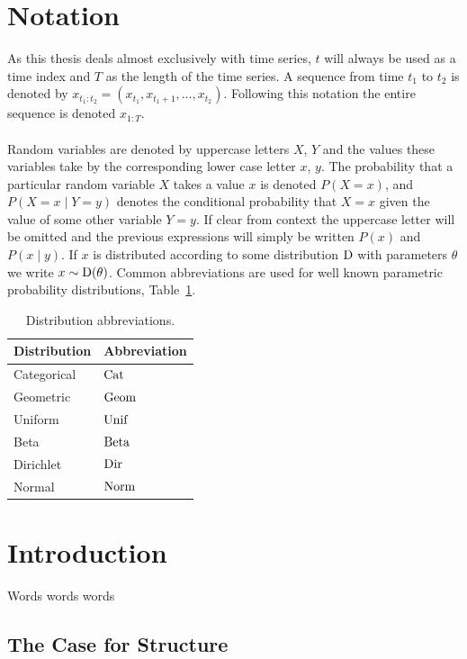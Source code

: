 \documentclass[12pt]{report}
\newcommand{\1}[0]{\mathbbm{1}}
\newcommand{\Beta}[0]{\textnormal{Beta}}
\newcommand{\Unif}[0]{\textnormal{Unif}}
\newcommand{\Cat}[0]{\textnormal{Cat}}
\newcommand{\Dir}[0]{\textnormal{Dir}}
\newcommand{\Norm}[0]{\textnormal{Norm}}
\newcommand{\SomeDist}[0]{\textnormal{D}}
\newcommand{\Geom}[0]{\textnormal{Geom}}
\newcommand{\seq}[3]{\ensuremath{#1_{{#2}:{#3}}}}
\begin{document}
\cleardoublepage
{}
\chapter*{Notation}
As this thesis deals almost exclusively with time series, $t$ will always
be used as a time index and $T$ as the length of the time series.
A sequence from time $t_1$ to $t_2$ is denoted by
$\seq{x}{t_1}{t_2} = (x_{t_1}, x_{t_1 + 1}, \ldots, x_{t_2})$.
Following this notation the entire sequence is denoted $\seq{x}{1}{T}$.
\\\\
Random variables are denoted by uppercase letters $X$, $Y$
and the values these variables take by the corresponding lower case
letter $x$, $y$. The probability that a particular random variable $X$
takes a value $x$ is denoted $P(X=x)$, and $P(X=x \mid Y=y)$ denotes
the conditional probability that $X=x$ given the value of some other variable $Y=y$.
If clear from context the uppercase letter will be omitted and the previous expressions
will simply be written $P(x)$ and $P(x \mid y)$. If $x$ is distributed according to some
distribution $\SomeDist$ with parameters $\theta$ we write $x \sim \SomeDist(\theta)$.
Common abbreviations are used for well known parametric probability distributions,
Table~\ref{table:distributions}.
\begin{table}[ht]
    \centering
    \begin{tabular}{l l}\hline
    \textbf{Distribution} & \textbf{Abbreviation}\\\hline
    Categorical & $\Cat$ \\
    Geometric & $\Geom$ \\
    Uniform & $\Unif$ \\
    Beta & $\Beta$ \\
    Dirichlet & $\Dir$ \\
    Normal & $\Norm$ \\
    \end{tabular}
    \caption[Distributions]{Distribution abbreviations.}
    \label{table:distributions}
\end{table}


\chapter{Introduction}
\label{chap:Introduction}
Words words words

\section{The Case for Structure}
\end{document}
